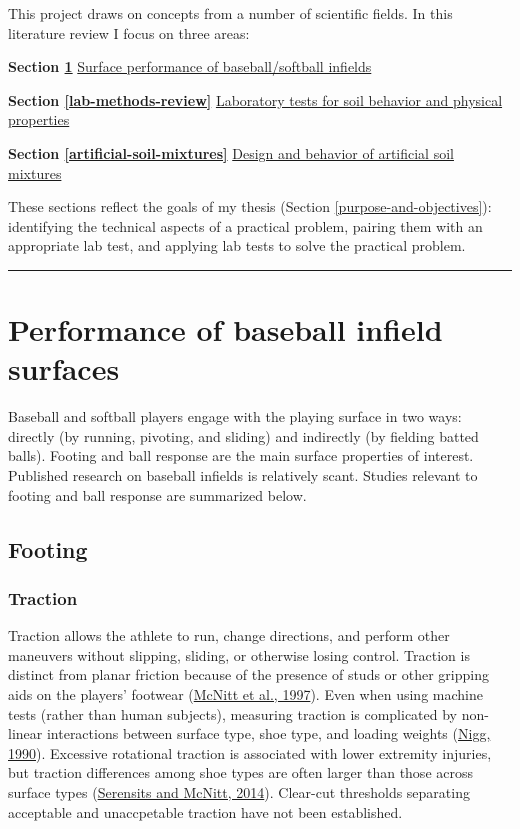 \documentclass[
  letterpaper,
  openany]{book}
\begin{document}
This project draws on concepts from a number of scientific fields.
In this literature review I focus on three areas:

\textbf{Section \ref{infield-performance}} \protect\hyperlink{infield-performance}{Surface performance of baseball/softball infields}

\textbf{Section \ref{lab-methods-review}} \protect\hyperlink{lab-methods-review}{Laboratory tests for soil behavior and physical properties}

\textbf{Section \ref{artificial-soil-mixtures}} \protect\hyperlink{artificial-soil-mixtures}{Design and behavior of artificial soil mixtures}

These sections reflect the goals of my thesis (Section \ref{purpose-and-objectives}): identifying the technical aspects of a practical problem, pairing them with an appropriate lab test, and applying lab tests to solve the practical problem.

\begin{center}\rule{0.5\linewidth}{0.5pt}\end{center}

\hypertarget{infield-performance}{%
\section{Performance of baseball infield surfaces}\label{infield-performance}}

Baseball and softball players engage with the playing surface in two ways: directly (by running, pivoting, and sliding) and indirectly (by fielding batted balls).
Footing and ball response are the main surface properties of interest.
Published research on baseball infields is relatively scant. Studies relevant to footing and ball response are summarized below.

\hypertarget{footing}{%
\subsection{Footing}\label{footing}}

\hypertarget{traction}{%
\subsubsection{Traction}\label{traction}}

Traction allows the athlete to run, change directions, and perform other maneuvers without slipping, sliding, or otherwise losing control.
Traction is distinct from planar friction because of the presence of studs or other gripping aids on the players' footwear (\protect\hyperlink{ref-McNitt1997a}{McNitt et al., 1997}).
Even when using machine tests (rather than human subjects), measuring traction is complicated by non-linear interactions between surface type, shoe type, and loading weights (\protect\hyperlink{ref-Nigg1990}{Nigg, 1990}).
Excessive rotational traction is associated with lower extremity injuries, but traction differences among shoe types are often larger than those across surface types (\protect\hyperlink{ref-Serensits2014}{Serensits and McNitt, 2014}).
Clear-cut thresholds separating acceptable and unaccpetable traction have not been established.
\end{document}
